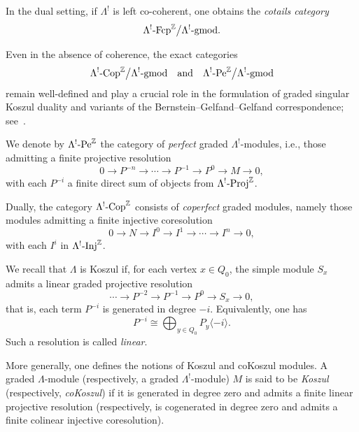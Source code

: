 \documentclass[11pt]{article}
\theoremstyle{definition}
\theoremstyle{remark}
\begin{document}
In the dual setting, if \(\Lambda^{!}\) is left co-coherent, one obtains the \emph{cotails category}
\[
\Lambda^{!}\textup{-Fcp}^{\mathbb{Z}} \big/ \Lambda^{!}\textup{-gmod}.
\]

\medskip

Even in the absence of coherence, the exact categories
\[
\Lambda^{!}\textup{-Cop}^{\mathbb{Z}} \big/ \Lambda^{!}\textup{-gmod}
\quad \text{and} \quad
\Lambda^{!}\textup{-Pe}^{\mathbb{Z}} \big/ \Lambda^{!}\textup{-gmod}
\]
remain well-defined and play a crucial role in the formulation of graded singular Koszul duality and variants of the Bernstein–Gelfand–Gelfand correspondence; see~\cite{4}.

\medskip

We denote by \(\Lambda^{!}\textup{-Pe}^{\mathbb{Z}}\) the category of \emph{perfect} graded \(\Lambda^{!}\)-modules, i.e., those admitting a finite projective resolution
\[
0 \longrightarrow P^{-n} \longrightarrow \cdots \longrightarrow P^{-1} \longrightarrow P^{0} \longrightarrow M \longrightarrow 0,
\]
with each \(P^{-i}\) a finite direct sum of objects from \(\Lambda^{!}\textup{-Proj}^{\mathbb{Z}}\).

Dually, the category \(\Lambda^{!}\textup{-Cop}^{\mathbb{Z}}\) consists of \emph{coperfect} graded modules, namely those modules admitting a finite injective coresolution
\[
0 \longrightarrow N \longrightarrow I^{0} \longrightarrow I^{1} \longrightarrow \cdots \longrightarrow I^{n} \longrightarrow 0,
\]
with each \(I^{i}\) in \(\Lambda^{!}\textup{-Inj}^{\mathbb{Z}}\).

\medskip


We recall that $\Lambda$ is Koszul if, for each vertex $x \in Q_{0}$, the simple module $S_{x}$ admits a linear graded projective resolution
\[
\cdots \longrightarrow P^{-2} \longrightarrow P^{-1} \longrightarrow P^{0} \longrightarrow S_{x} \longrightarrow 0,
\]
that is, each term $P^{-i}$ is generated in degree $-i$. Equivalently, one has
\[
P^{-i} \cong \bigoplus_{y \in Q_{0}} P_{y}\langle -i\rangle.
\]
Such a resolution is called \emph{linear}.

\medskip

More generally, one defines the notions of Koszul and coKoszul modules. A graded $\Lambda$-module (respectively, a graded $\Lambda^{!}$-module) $M$ is said to be \emph{Koszul} (respectively, \emph{coKoszul}) if it is generated in degree zero and admits a finite linear projective resolution (respectively, is cogenerated in degree zero and admits a finite colinear injective coresolution).
\end{document}
